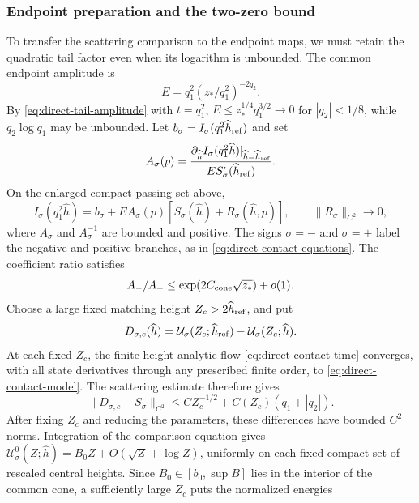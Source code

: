 \subsubsection{Endpoint preparation and the two-zero bound}

To transfer the scattering comparison to the endpoint maps, we must
retain the quadratic tail factor even when its logarithm is unbounded.
The common endpoint amplitude is
\begin{equation}
\label{eq:direct-contact-amplitude}
 E=q_1^2(z_*/q_1^2)^{-2q_2}.
\end{equation}
By \eqref{eq:direct-tail-amplitude} with \(t=q_1^2\),
\(E\le z_*^{1/4}q_1^{3/2}\to0\) for \(|q_2|<1/8\), while
\(q_2\log q_1\) may be unbounded.
Let \(b_\sigma=I_\sigma(q_1^2\widehat h_{\rm ref})\) and set
\[
 A_\sigma(p)=
 \frac{\partial_{\widehat h} I_\sigma(q_1^2\widehat h)|_{\widehat h=\widehat h_{\rm ref}}}
      {E S_\sigma'(\widehat h_{\rm ref})}.
\]
On the enlarged compact passing set above,
\begin{equation}
\label{eq:direct-contact-actual-preparation}
 I_\sigma(q_1^2\widehat h)=b_\sigma+
 E A_\sigma(p)[S_\sigma(\widehat h)+R_\sigma(\widehat h,p)],\qquad
 \|R_\sigma\|_{C^2}\longrightarrow0,
\end{equation}
where \(A_\sigma\) and \(A_\sigma^{-1}\) are bounded and positive.
The signs \(\sigma=-\) and \(\sigma=+\) label the negative and positive
branches, as in \eqref{eq:direct-contact-equations}. The coefficient
ratio satisfies
\begin{equation}
\label{eq:direct-contact-slope-quotient}
 A_-/A_+\le \exp(2C_{\rm cone}\sqrt{z_*})+o(1).
\end{equation}
Choose a large fixed matching height \(Z_c>2\widehat h_{\rm ref}\), and put
\[
 D_{\sigma,c}(\widehat h)
 =\mathcal U_\sigma(Z_c;\widehat h_{\rm ref})-\mathcal U_\sigma(Z_c;\widehat h).
\]
At each fixed \(Z_c\), the finite-height analytic flow
\eqref{eq:direct-contact-time} converges, with all state derivatives
through any prescribed finite order, to \eqref{eq:direct-contact-model}. The
scattering estimate therefore gives
\[
 \|D_{\sigma,c}-S_\sigma\|_{C^2}
 \le CZ_c^{-1/2}+C(Z_c)(q_1+|q_2|).
\]
After fixing \(Z_c\) and reducing the parameters, these differences
have bounded $C^2$ norms. Integration of the comparison equation gives
\(\mathcal U_\sigma^0(Z;\widehat h)=B_0Z+O(\sqrt Z+\log Z)\), uniformly on
each fixed compact set of rescaled central heights. Since
\(B_0\in[b_0,\sup B]\) lies in the interior of the common cone, a
sufficiently large \(Z_c\) puts the normalized energies
